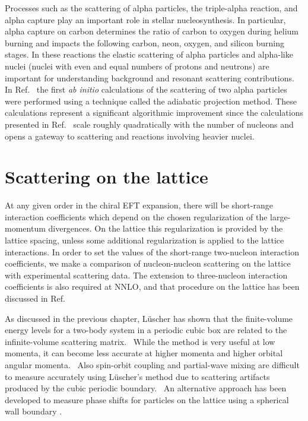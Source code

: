 Processes such as the scattering of alpha particles,
the triple-alpha reaction, and
alpha capture play an important role in stellar nucleosynthesis.  In
particular, alpha capture on carbon determines the ratio of carbon to oxygen
during helium burning and impacts the following carbon, neon, oxygen,
and silicon burning stages.  In these
reactions the elastic scattering of alpha particles
and alpha-like nuclei (nuclei with even and equal numbers of protons
and neutrons) are important for understanding background and resonant
scattering contributions.  In Ref.~\cite{Elhatisari:2015iga}
the first {\it ab initio}
calculations of the scattering of two alpha particles were performed using a technique called the adiabatic projection method.  These
calculations represent a significant algorithmic improvement since the calculations presented in
 Ref.~\cite{Elhatisari:2015iga}
scale roughly quadratically with the number of nucleons and opens a gateway to scattering and reactions involving heavier nuclei. \\ 





\section{Scattering on the lattice}

At any given order in the chiral EFT expansion, there will be short-range interaction coefficients which depend on the chosen regularization of the large-momentum divergences.  On the lattice this regularization is provided by the lattice spacing, unless some additional regularization
is applied to the lattice interactions.
In order to set the values of the short-range two-nucleon interaction
coefficients, we make a comparison of nucleon-nucleon scattering on
the lattice with experimental scattering data.  The extension to three-nucleon
interaction coefficients is also required at NNLO, and that procedure
on the lattice has been discussed in Ref.~\cite{Epelbaum:2009zs}


As discussed in the previous chapter, L\"{u}scher \cite{Luscher:1985dn,Luscher:1986pf,Luscher:1991ux} has shown that the finite-volume energy levels for a two-body system in a periodic cubic box are related to the infinite-volume scattering matrix. \ While the method is very useful
at low momenta, it can become less accurate at higher momenta and higher orbital angular momenta. \ Also spin-orbit
coupling and partial-wave mixing are difficult to measure accurately using
L\"{u}scher's method due to scattering artifacts produced by the
cubic periodic boundary. \ An alternative approach has been developed to measure
phase shifts for particles on the lattice using a spherical wall boundary \cite{Borasoy:2007vy,Carlson:1984}.
\ 

